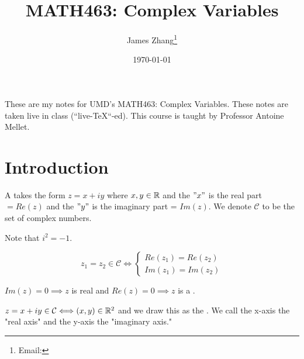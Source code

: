 \documentclass[12pt]{scrartcl}
\newcommand{\C}{\mathcal{C}}
\begin{document}
\title{MATH463: Complex Variables}
\author{James Zhang\thanks{Email: }}
\date{\today}




\maketitle
These are my notes for UMD's MATH463: Complex Variables. These notes are taken live in class 
(``live-\TeX``-ed). This course is taught by Professor Antoine Mellet.
\tableofcontents

\newpage

\section{Introduction}

\begin{definition}
    A  takes the form $z = x + iy$ where $x, y \in \mathbb R$ and the $"x"$ is the 
    real part $= Re(z)$ and the $"y"$ is the imaginary part = $Im(z)$. We denote $\C$ to be the set of 
    complex numbers.
\end{definition}

\begin{note}
  Note that $i^2 = -1$. 
\end{note}

\begin{note}
  \[z_1 = z_2 \in \C \Longleftrightarrow \begin{cases}
    Re(z_1) = Re(z_2) \\ 
    Im(z_1) = Im(z_2)
  \end{cases}\]
\end{note}

\begin{definition}
  $Im(z) = 0 \implies z$ is real and $Re(z) = 0 \implies z$ is a .
\end{definition}

\begin{note}
  $z = x + iy \in \C \Longleftrightarrow (x, y) \in \RR^2$
  and we draw this as the . We call the 
  x-axis the "real axis" and the y-axis the "imaginary axis."
\end{note}
\end{document}
